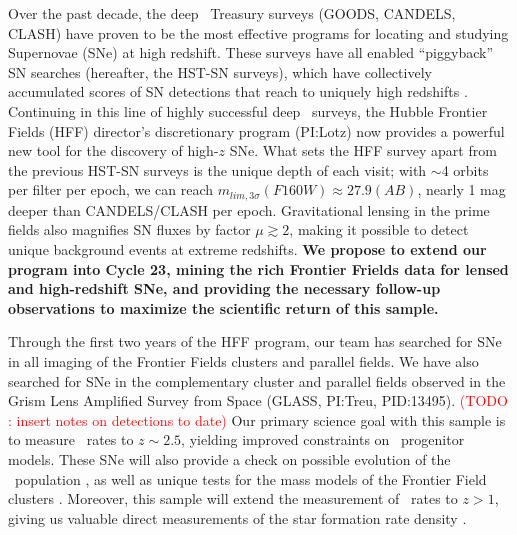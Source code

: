 \documentclass[12pt]{article}
\begin{document}
%
%
\justification          %

Over the past decade, the deep \HST\ Treasury surveys (GOODS, CANDELS,
CLASH) have proven to be the most effective programs for locating and
studying Supernovae (SNe) at high redshift.  These surveys have all
enabled ``piggyback'' SN searches (hereafter, the HST-SN surveys),
which have collectively accumulated scores of SN detections that reach
to uniquely high redshifts
\citep{Riess:2007,Dahlen:2008,Graur:2014a,Rodney:2014}.  Continuing in
this line of highly successful deep \HST\ surveys, the Hubble Frontier
Fields (HFF) director's discretionary program (PI:Lotz) now provides a
powerful new tool for the discovery of high-$z$ SNe.  What sets the
HFF survey apart from the previous HST-SN surveys is the unique depth
of each visit; with $\sim$4 orbits per filter per epoch, we can reach
$m_{lim,3\sigma}(F160W)\approx27.9 (AB)$, nearly 1 mag deeper than
CANDELS/CLASH per epoch. Gravitational lensing in the prime fields
also magnifies SN fluxes by factor $\mu\gtrsim2$, making it possible
to detect unique background events at extreme redshifts.  
{\bf We propose to extend our program into Cycle 23, mining the rich
Frontier Frields data for lensed and high-redshift SNe, and
  providing the necessary follow-up observations to maximize the
  scientific return of this sample.}

Through the first two years of the HFF program, our team has searched
for SNe in all imaging of the Frontier Fields clusters and parallel
fields.  We have also searched for SNe in the complementary cluster
and parallel fields observed in the Grism Lens Amplified Survey from
Space (GLASS, PI:Treu, PID:13495).
\textcolor{red}{ (TODO : insert notes on detections to date)}
Our primary science goal with
this sample is to measure \SNIa\ rates to $z\sim2.5$, yielding
improved constraints on \SNIa\ progenitor models.  These SNe will also
provide a check on possible evolution of the \SNIa\
population \citep{Riess:2006}, as well as unique tests for the mass
models of the Frontier Field clusters \citep{Riehm:2011}. Moreover,
this sample will extend the measurement of \CCSN\ rates to $z>1$,
giving us valuable direct measurements of the star formation rate
density \citep{Dahlen:2012}.
\end{document}
